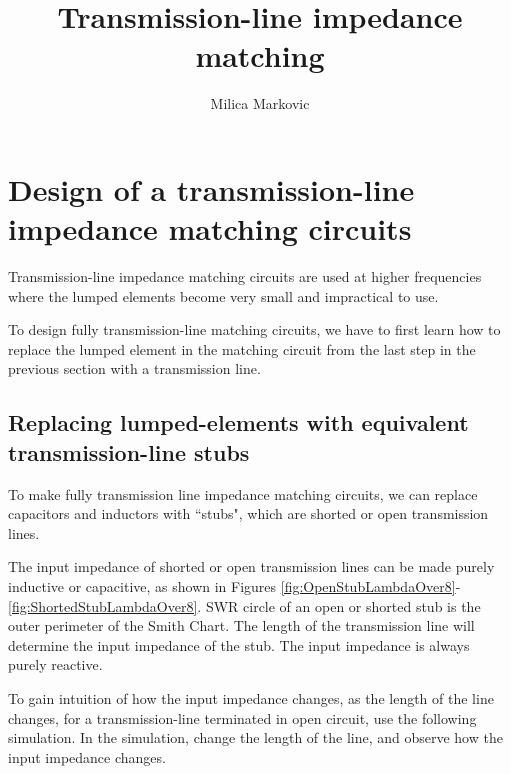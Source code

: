 \documentclass{ximera}
\title{Transmission-line impedance matching}
\author{Milica Markovic}
\begin{document}
  
\begin{abstract}  

\end{abstract}  
\maketitle    



\section{Design of a transmission-line impedance matching circuits}

Transmission-line impedance matching circuits are used at higher frequencies where the lumped elements become very small and impractical to use. 

To design fully transmission-line matching circuits, we have to first learn how to replace the lumped element in the matching circuit from the last step in the previous section with a transmission line. 

\subsection{Replacing lumped-elements with equivalent transmission-line stubs}

To make fully transmission line impedance matching circuits, we can replace capacitors and inductors with ``stubs", which are shorted or open transmission lines. 

The input impedance of shorted or open transmission lines can be made purely inductive or capacitive, as shown in Figures \ref{fig:OpenStubLambdaOver8}-\ref{fig:ShortedStubLambdaOver8}. SWR circle of an open or shorted stub is the outer perimeter of the Smith Chart. The length of the transmission line will determine the input impedance of the stub. The input impedance is always purely reactive. 


To gain intuition of how the input impedance changes, as the length of the line changes, for a transmission-line terminated in open circuit, use the following simulation. In the simulation, change the length of the line, and observe how the input impedance changes.

\begin{center}  
\end{center} 
\end{document}

